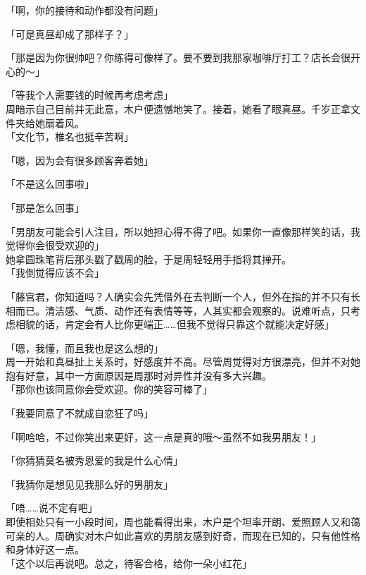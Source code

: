 「啊，你的接待和动作都没有问题」

「可是真昼却成了那样子？」

「那是因为你很帅吧？你练得可像样了。要不要到我那家咖啡厅打工？店长会很开心的～」

「等我个人需要钱的时候再考虑考虑」\\

周暗示自己目前并无此意，木户便遗憾地笑了。接着，她看了眼真昼。千岁正拿文件夹给她扇着风。\\

「文化节，椎名也挺辛苦啊」

「嗯，因为会有很多顾客奔着她」

「不是这么回事啦」

「那是怎么回事」

「男朋友可能会引人注目，所以她担心得不得了吧。如果你一直像那样笑的话，我觉得你会很受欢迎的」\\

她拿圆珠笔背后那头戳了戳周的脸，于是周轻轻用手指将其掸开。\\

「我倒觉得应该不会」

「藤宫君，你知道吗？人确实会先凭借外在去判断一个人，但外在指的并不只有长相而已。清洁感、气质、动作还有表情等等，人其实都会观察的。说难听点，只考虑相貌的话，肯定会有人比你更端正……但我不觉得只靠这个就能决定好感」

「嗯，我懂，而且我也是这么想的」\\

周一开始和真昼扯上关系时，好感度并不高。尽管周觉得对方很漂亮，但并不对她抱有好意，其中一方面原因是周那时对异性并没有多大兴趣。\\

「那你也该同意你会受欢迎。你的笑容可棒了」

「我要同意了不就成自恋狂了吗」

「啊哈哈，不过你笑出来更好，这一点是真的哦～虽然不如我男朋友！」

「你猜猜莫名被秀恩爱的我是什么心情」

「我猜你是想见见我那么好的男朋友」

「唔……说不定有吧」\\

即使相处只有一小段时间，周也能看得出来，木户是个坦率开朗、爱照顾人又和蔼可亲的人。周确实对木户如此喜欢的男朋友感到好奇，而现在已知的，只有他性格和身体好这一点。\\

「这个以后再说吧。总之，待客合格，给你一朵小红花」\\

